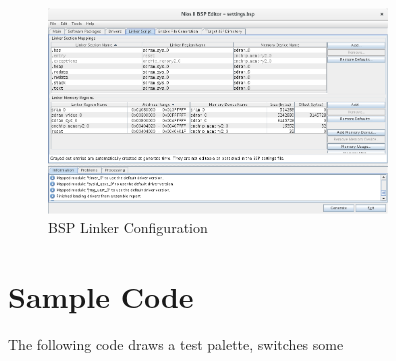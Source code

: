 \documentclass{capstonedoc}
\begin{document}
\begin{figure}[ht]
  \centering
  \includegraphics[width=9cm]{bsp_config}
  \caption{BSP Linker Configuration}
  \label{fig:bspconfig}
\end{figure}

\section{Sample Code}

The following code draws a test palette, switches some 
\end{document}

